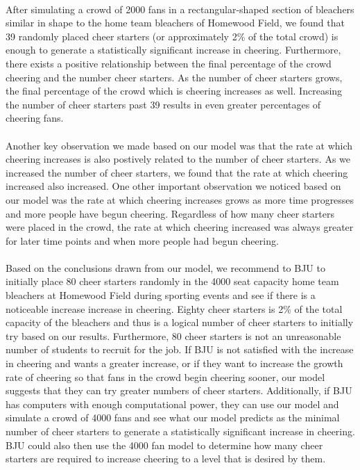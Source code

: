 \documentclass[oneside,12pt]{report}
\begin{document}
\paragraph{}
After simulating a crowd of 2000 fans in a rectangular-shaped section of bleachers similar in shape to the home team bleachers of Homewood Field, we found that 39 randomly placed cheer starters (or approximately 2\% of the total crowd) is enough to generate a statistically significant increase in cheering. Furthermore, there exists a positive relationship between the final percentage of the crowd cheering and the number cheer starters. As the number of cheer starters grows, the final percentage of the crowd which is cheering increases as well. Increasing the number of cheer starters past 39 results in even greater percentages of cheering fans.
\paragraph{}
Another key observation we made based on our model was that the rate at which cheering increases is also postively related to the number of cheer starters. As we increased the number of cheer starters, we found that the rate at which cheering increased also increased. One other important observation we noticed based on our model was the rate at which cheering increases grows as more time progresses and more people have begun cheering. Regardless of how many cheer starters were placed in the crowd, the rate at which cheering increased was always greater for later time points and when more people had begun cheering.
\paragraph{}
Based on the conclusions drawn from our model, we recommend to BJU to initially place 80 cheer starters randomly in the 4000 seat capacity home team bleachers at Homewood Field during sporting events and see if there is a noticeable increase increase in cheering. Eighty cheer starters is 2\% of the total capacity of the bleachers and thus is a logical number of cheer starters to initially try based on our results. Furthermore, 80 cheer starters is not an unreasonable number of students to recruit for the job. If BJU is not satisfied with the increase in cheering and wants a greater increase, or if they want to increase the growth rate of cheering so that fans in the crowd begin cheering sooner, our model suggests that they can try greater numbers of cheer starters. Additionally, if BJU has computers with enough computational power, they can use our model and simulate a crowd of 4000 fans and see what our model predicts as the minimal number of cheer starters to generate a statistically significant increase in cheering. BJU could also then use the 4000 fan model to determine how many cheer starters are required to increase cheering to a level that is desired by them. 
\end{document}
